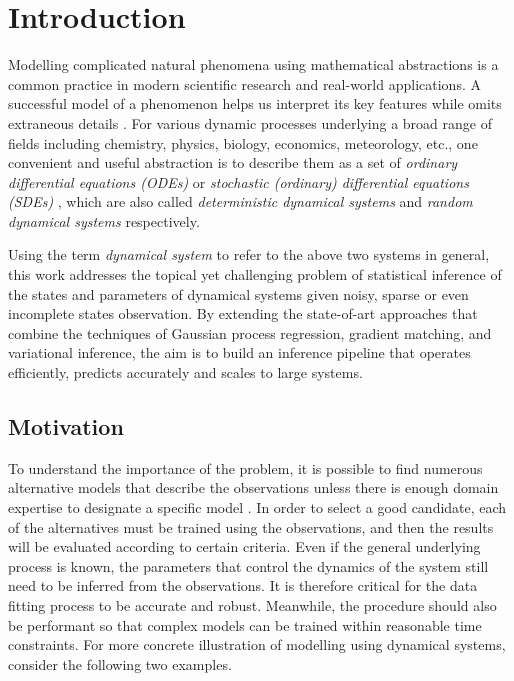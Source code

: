 \chapter{Introduction}
\label{ch-introduction}

Modelling complicated natural phenomena using mathematical abstractions is a common practice in modern scientific research and real-world applications.
A successful model of a phenomenon helps us interpret its key features while omits extraneous details \citep{babtie2014topological}.
For various dynamic processes underlying a broad range of fields including chemistry, physics, biology, economics, meteorology, etc., one convenient and useful abstraction is to describe them as a set of \emph{ordinary differential equations (ODEs)} or \emph{stochastic (ordinary) differential equations (SDEs)} 
    \citep{ellner2011dynamic, gardiner2009stochastic}, which are also called  \emph{deterministic dynamical systems} and \emph{random dynamical systems} respectively.

Using the term \emph{dynamical system} to refer to the above two systems in general, this work addresses the topical yet challenging problem of statistical inference of the states and parameters of dynamical systems given noisy, sparse or even incomplete states observation. 
By extending the state-of-art approaches that combine the techniques of Gaussian process regression, gradient matching, and variational inference, the aim is to build an inference pipeline that operates efficiently, predicts accurately and scales to large systems.

\section{Motivation}
\label{sec-motivation}

To understand the importance of the problem, it is possible to find numerous alternative models that describe the observations unless there is enough domain expertise to designate a specific model \citep{babtie2014topological}.
In order to select a good candidate, each of the alternatives must be trained using the observations, and then the results will be evaluated according to certain criteria.
Even if the general underlying process is known, the parameters that control the dynamics of the system still need to be inferred from the observations. 
It is therefore critical for the data fitting process to be accurate and robust.
Meanwhile, the procedure should also be performant so that complex models can be trained within reasonable time constraints.
For more concrete illustration of modelling using dynamical systems, consider the following two examples.

